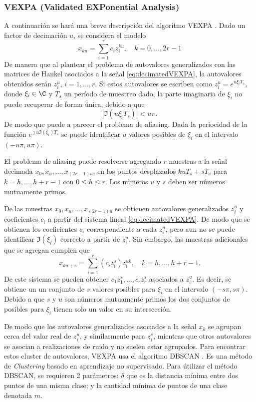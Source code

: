 \subsubsection{VEXPA (Validated EXPonential Analysis)}\label{VEXPA_Appendix}

A continuación se hará una breve descripción del algoritmo VEXPA \cite{BRIANI2020}. Dado un factor de decimación $u$, se considera el modelo 
\begin{equation}
	x_{ku} = \sum_{i=1}^r c_iz_i^{ku}, \quad k = 0,\ldots, 2r-1
	\label{eq:decimatedVEXPA}
\end{equation}
De manera que al plantear el problema de autovalores generalizados con las matrices de Hankel asociados a la señal \eqref{eq:decimatedVEXPA}, la autovalores obtenidos serán $z_i^u$, $i=1,\ldots, r$. Si estos autovalores se escriben como $z_i^u = e^{u\xi_iT_s}$, donde $\xi_i\in \C$ y $T_s$ un período de muestreo dado, la parte imaginaria de $\xi_i$ no puede recuperar de forma única, debido a que 
\[|\Im(u\xi_iT_s)|<u\pi.\]
De modo que puede a parecer el problema de aliasing. Dada la periocidad de la función $e^{\jmath u\Im(\xi_i)T_s}$ se puede identificar $u$ valores posibles de $\xi_i$ en el intervalo  $(-u\pi,u\pi)$.

El problema de aliasing puede resolverse agregando $r$ muestras a la señal decimada $x_0,x_u,\ldots,x_{(2r-1)u}$, en los puntos desplazados $kuT_s + s T_s$ para $k = h,\ldots,h+r-1$ con $0\le h\le r$. Los números $u$ y $s$ deben ser números mutuamente primos.

De las muestras $x_0,x_u,\ldots,x_{(2r-1)u}$ se obtienen autovalores generalizados $z_i^u$ y coeficientes $c_i$ a partir del sistema lineal \eqref{eq:decimatedVEXPA}. De modo que se obtienen los coeficientes $c_i$ correspondiente a cada $z_i^u$, pero aun no se puede identificar $\Im(\xi_i)$ correcto a partir de $z_i^u$. Sin embargo, las muestras adicionales que se agregan cumplen que 
\[x_{ku + s} = \sum_{i=1}^r (c_iz_i^{s})z_i^{uk}, \quad k = h,\ldots, h+r-1. \]
De este sistema se pueden obtener $c_1z_1^{s}, \ldots,c_rz_r^{s}$ asociados a $z_i^u$. Es decir, se obtiene un un conjunto de $s$ valores posibles para $\xi_i$ en el intervalo  $(-s\pi,s\pi)$. Debido a que $s$ y $u$ son números mutuamente primos los dos conjuntos de posibles para $\xi_i$ tienen solo un valor en su intersección. 

De modo que los autovalores generalizados asociados a la señal $x_k$ se agrupan cerca del valor real de $z_i^u$, y similarmente para $z_i^{s}$, mientras que otros autovalores se asocian a realizaciones de ruido y no suelen estar agrupados.  Para encontrar estos cluster de autovalores, VEXPA usa el algoritmo DBSCAN \cite{ester1996}. Es una método de \emph{Clustering} basado en aprendizaje no supervisado. Para útilizar el método DBSCAN, se requieren 2 parámetros: $\delta$ que es la distancia mínima entre dos puntos de una misma clase; y la cantidad mínima de puntos de una clase denotada $m$. 

